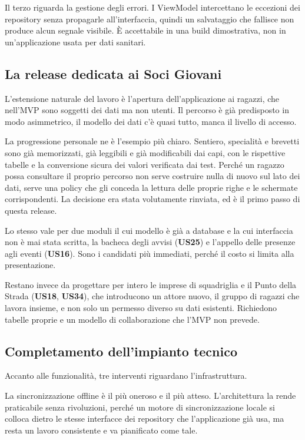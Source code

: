 \documentclass[11pt]{article}
\numberwithin{figure}{section}
\begin{document}
Il terzo riguarda la gestione degli errori. I ViewModel intercettano le eccezioni dei repository senza propagarle all'interfaccia, quindi un salvataggio che fallisce non produce alcun segnale visibile. È accettabile in una build dimostrativa, non in un'applicazione usata per dati sanitari.

\subsection{La release dedicata ai Soci Giovani}

L'estensione naturale del lavoro è l'apertura dell'applicazione ai ragazzi, che nell'MVP sono soggetti dei dati ma non utenti. Il percorso è già predisposto in modo asimmetrico, il modello dei dati c'è quasi tutto, manca il livello di accesso.

La progressione personale ne è l'esempio più chiaro. Sentiero, specialità e brevetti sono già memorizzati, già leggibili e già modificabili dai capi, con le rispettive tabelle e la conversione sicura dei valori verificata dai test. Perché un ragazzo possa consultare il proprio percorso non serve costruire nulla di nuovo sul lato dei dati, serve una policy che gli conceda la lettura delle proprie righe e le schermate corrispondenti. La decisione era stata volutamente rinviata, ed è il primo passo di questa release.

Lo stesso vale per due moduli il cui modello è già a database e la cui interfaccia non è mai stata scritta, la bacheca degli avvisi (\textbf{US25}) e l'appello delle presenze agli eventi (\textbf{US16}). Sono i candidati più immediati, perché il costo si limita alla presentazione.

Restano invece da progettare per intero le imprese di squadriglia e il Punto della Strada (\textbf{US18}, \textbf{US34}), che introducono un attore nuovo, il gruppo di ragazzi che lavora insieme, e non solo un permesso diverso su dati esistenti. Richiedono tabelle proprie e un modello di collaborazione che l'MVP non prevede.

\subsection{Completamento dell'impianto tecnico}

Accanto alle funzionalità, tre interventi riguardano l'infrastruttura.

La sincronizzazione offline è il più oneroso e il più atteso. L'architettura la rende praticabile senza rivoluzioni, perché un motore di sincronizzazione locale si colloca dietro le stesse interfacce dei repository che l'applicazione già usa, ma resta un lavoro consistente e va pianificato come tale.
\end{document}
